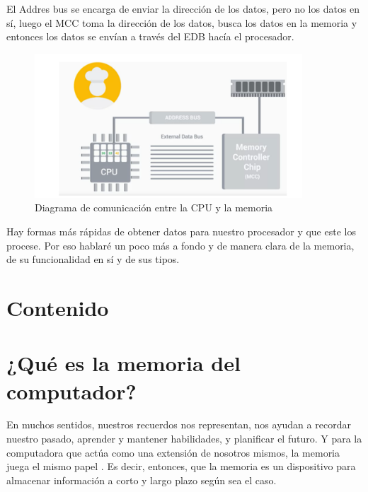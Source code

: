 \documentclass{article}
\begin{document}
El Addres bus se encarga de enviar la dirección de los datos, pero no los datos en sí, luego el MCC toma la dirección de los datos, busca los datos en la memoria y entonces los datos se envían a través del EDB hacía el procesador\cite{Coursera}.

\begin{figure}[h]
\includegraphics[width=10cm]{Captura.1.PNG}
\centering
\caption{Diagrama de comunicación entre la CPU y la memoria}
\label{Captura.1.PNG}
\end{figure}
Hay formas más rápidas de obtener datos para nuestro procesador y que este los procese. Por eso hablaré un poco más a fondo y de manera clara de la memoria, de su funcionalidad en sí y de sus tipos. 

\section{Contenido} \label{contenido}

\section{¿Qué es la memoria del computador?}
En muchos sentidos, nuestros recuerdos nos representan, nos ayudan a recordar nuestro pasado, aprender y mantener habilidades, y planificar el futuro. Y para la computadora que actúa como una extensión de nosotros mismos, la memoria juega el mismo papel\cite{TEDwebsite} . Es decir, entonces, que la memoria es un dispositivo para almacenar información a corto y largo plazo según sea el caso. 
\vspace{0.2cm}
\end{document}
